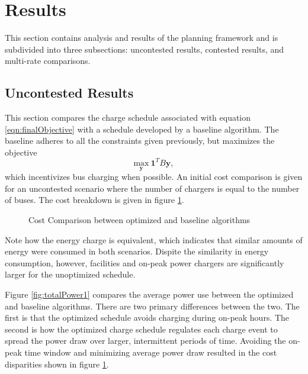 \section{Results}
This section contains analysis and results of the planning framework and is subdivided into three subsections: uncontested results, contested results, and multi-rate comparisons.
\subsection{Uncontested Results}
This section compares the charge schedule associated with equation \ref{eqn:finalObjective} with a schedule developed by a baseline algorithm.  The baseline adheres to all the constraints given previously, but maximizes the objective 
\begin{equation}
	\underset{\mathbf{y}}{\text{max}} \ \mathbf{1}^TB\mathbf{y},
\end{equation}
which incentivizes bus charging when possible. An initial cost comparison is given for an uncontested scenario where the number of chargers is equal to the number of buses. The cost breakdown is given in figure \ref{fig:costComparison}.
\begin{figure}
	\centering
	\caption{Cost Comparison between optimized and baseline algorithms}
	\label{fig:costComparison}
\end{figure}
\par Note how the energy charge is equivalent, which indicates that similar amounts of energy were consumed in both scenarios. Dispite the similarity in energy consumption, however, facilities and on-peak power chargers are significantly larger for the unoptimized schedule. 
\par Figure \ref{fig:totalPower1} compares the average power use between the optimized and baseline algorithms. There are two primary differences between the two. The first is that the optimized schedule avoids charging during on-peak hours.  The second is how the optimized charge schedule regulates each charge event to spread the power draw over larger, intermittent periods of time. Avoiding the on-peak time window and minimizing average power draw resulted in the cost disparities shown in figure \ref{fig:costComparison}.

